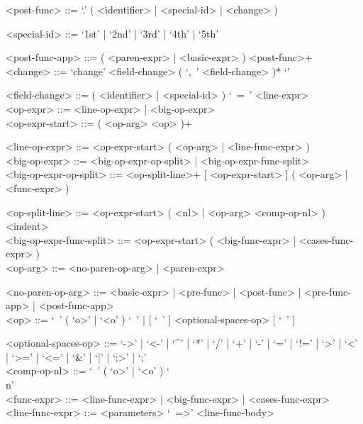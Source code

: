 \documentclass{article}
\begin{document}
\begin{grammar}
<post-func> ::= `.' ( <identifier> | <special-id> | <change> )

<special-id> ::= `1st' | `2nd' | `3rd' | `4th' | `5th'

<post-func-app> ::= ( <paren-expr> | <basic-expr> ) <post-func>+
\\

<change> ::= `change{' <field-change> ( `,\ ' <field-change> )* `}'

<field-change> ::= ( <identifier> | <special-id> ) `\ =\ ' <line-expr>
\\

<op-expr> ::= <line-op-expr> | <big-op-expr>
\\

<op-expr-start> ::= ( <op-arg> <op> )+

<line-op-expr> ::= <op-expr-start> ( <op-arg> | <line-func-expr> )
\\

<big-op-expr> ::= 
<big-op-expr-op-split> | <big-op-expr-func-split>
\\

<big-op-expr-op-split> ::= 
<op-split-line>+ [ <op-expr-start> ] ( <op-arg> | <func-expr> )

<op-split-line> ::=
<op-expr-start> ( <nl> | <op-arg> <comp-op-nl> ) <indent> 
\\

<big-op-expr-func-split> ::= <op-expr-start> ( <big-func-expr> | <cases-func-expr> )
\\

<op-arg> ::= <no-paren-op-arg> | <paren-expr>

<no-paren-op-arg> ::=
<basic-expr> | <pre-func> | <post-func> | <pre-func-app> | <post-func-app>
\\

<op> ::=  
`\ ' ( `o>' | `<o' ) `\ ' | [ `\ ' ] <optional-spaces-op> [ `\ ' ]

<optional-spaces-op> ::= 
`->' | `<-' | `^' | `*' | `/' | `+' | `-' | `=' | `!=' | `>' | `<' | `>=' | `<=' |
`\&' | `|' | `;>' | `;'
\\

<comp-op-nl> ::= `\ ' ( `o>' | `<o' ) `\\n'
\\

<func-expr> ::= <line-func-expr> | <big-func-expr> | <cases-func-expr>
\\

<line-func-expr> ::= <parameters> `\ =>' <line-func-body>


\end{grammar}
\end{document}
